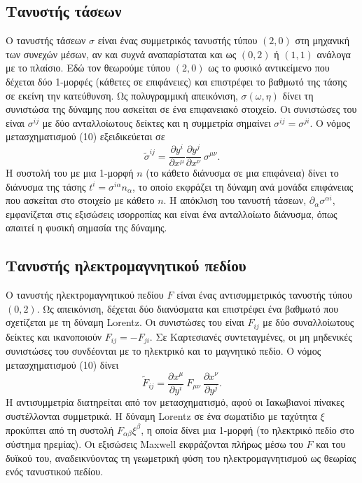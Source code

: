 \documentclass[12pt]{article}
\begin{document}
\subsection{Τανυστής τάσεων}
Ο τανυστής τάσεων \( \sigma \) είναι ένας συμμετρικός τανυστής τύπου \( (2,0) \) στη μηχανική των συνεχών μέσων, αν και συχνά αναπαρίσταται και ως \( (0,2) \) ή \( (1,1) \) ανάλογα με το πλαίσιο. Εδώ τον θεωρούμε τύπου \( (2,0) \) ως το φυσικό αντικείμενο που δέχεται δύο 1-μορφές (κάθετες σε επιφάνειες) και επιστρέφει το βαθμωτό της τάσης σε εκείνη την κατεύθυνση. Ως πολυγραμμική απεικόνιση, \( \sigma(\omega, \eta) \) δίνει τη συνιστώσα της δύναμης που ασκείται σε ένα επιφανειακό στοιχείο. Οι συνιστώσες του είναι \( \sigma^{ij} \) με δύο ανταλλοίωτους δείκτες και η συμμετρία σημαίνει \( \sigma^{ij} = \sigma^{ji} \). Ο νόμος μετασχηματισμού (10) εξειδικεύεται σε
\[
\tilde{\sigma}^{ij} = \frac{\partial y^i}{\partial x^\mu} \frac{\partial y^j}{\partial x^\nu} \ \sigma^{\mu\nu}. \tag{21}
\]
Η συστολή του με μια 1-μορφή \( n \) (το κάθετο διάνυσμα σε μια επιφάνεια) δίνει το διάνυσμα της τάσης \( t^i = \sigma^{i\alpha} n_\alpha \), το οποίο εκφράζει τη δύναμη ανά μονάδα επιφάνειας που ασκείται στο στοιχείο με κάθετο \( n \). Η απόκλιση του τανυστή τάσεων, \( \partial_\alpha \sigma^{\alpha i} \), εμφανίζεται στις εξισώσεις ισορροπίας και είναι ένα ανταλλοίωτο διάνυσμα, όπως απαιτεί η φυσική σημασία της δύναμης.

\subsection{Τανυστής ηλεκτρομαγνητικού πεδίου}
Ο τανυστής ηλεκτρομαγνητικού πεδίου \( F \) είναι ένας αντισυμμετρικός τανυστής τύπου \( (0,2) \). Ως απεικόνιση, δέχεται δύο διανύσματα και επιστρέφει ένα βαθμωτό που σχετίζεται με τη δύναμη Lorentz. Οι συνιστώσες του είναι \( F_{ij} \) με δύο συναλλοίωτους δείκτες και ικανοποιούν \( F_{ij} = -F_{ji} \). Σε Καρτεσιανές συντεταγμένες, οι μη μηδενικές συνιστώσες του συνδέονται με το ηλεκτρικό και το μαγνητικό πεδίο. Ο νόμος μετασχηματισμού (10) δίνει
\[
\tilde{F}_{ij} = \frac{\partial x^\mu}{\partial y^i} \ F_{\mu\nu} \ \frac{\partial x^\nu}{\partial y^j}. \tag{22}
\]
Η αντισυμμετρία διατηρείται από τον μετασχηματισμό, αφού οι Ιακωβιανοί πίνακες συστέλλονται συμμετρικά. Η δύναμη Lorentz σε ένα σωματίδιο με ταχύτητα \( \xi \) προκύπτει από τη συστολή \( F_{\alpha\beta} \xi^\beta \), η οποία δίνει μια 1-μορφή (το ηλεκτρικό πεδίο στο σύστημα ηρεμίας). Οι εξισώσεις Maxwell εκφράζονται πλήρως μέσω του \( F \) και του δυϊκού του, αναδεικνύοντας τη γεωμετρική φύση του ηλεκτρομαγνητισμού ως θεωρίας ενός τανυστικού πεδίου.
\end{document}
